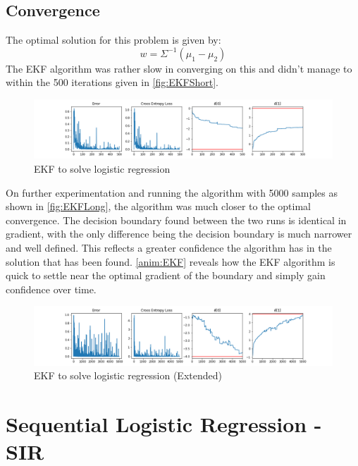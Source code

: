 \documentclass[sigconf]{acmart}
\begin{document}
\subsection{Convergence}
The optimal solution for this problem is given by: $$w = \Sigma^{-1} (\mu_1 - \mu_2) $$ The EKF algorithm was rather slow in converging on this and didn't manage to within the 500 iterations given in \autoref{fig:EKFShort}.
\begin{figure}[h]
  \centering
  \includegraphics[width=\linewidth]{../Part 2/LogReg1.png}
  \caption{EKF to solve logistic regression}
  \label{fig:EKFShort}
\end{figure}

On further experimentation and running the algorithm with 5000 samples as shown in \autoref{fig:EKFLong}, the algorithm was much closer to the optimal convergence. The decision boundary found between the two runs is identical in gradient, with the only difference being the decision boundary is much narrower and well defined.
This reflects a greater confidence the algorithm has in the solution that has been found. \autoref{anim:EKF} reveals how the EKF algorithm is quick to settle near the optimal gradient of the boundary and simply gain confidence over time. 
\begin{figure}[h]
  \centering
  \includegraphics[width=\linewidth]{../Part 2/LogReg2.png}
  \caption{EKF to solve logistic regression (Extended)}
  \label{fig:EKFLong}
\end{figure}

\section{Sequential Logistic Regression - SIR}
\end{document}
